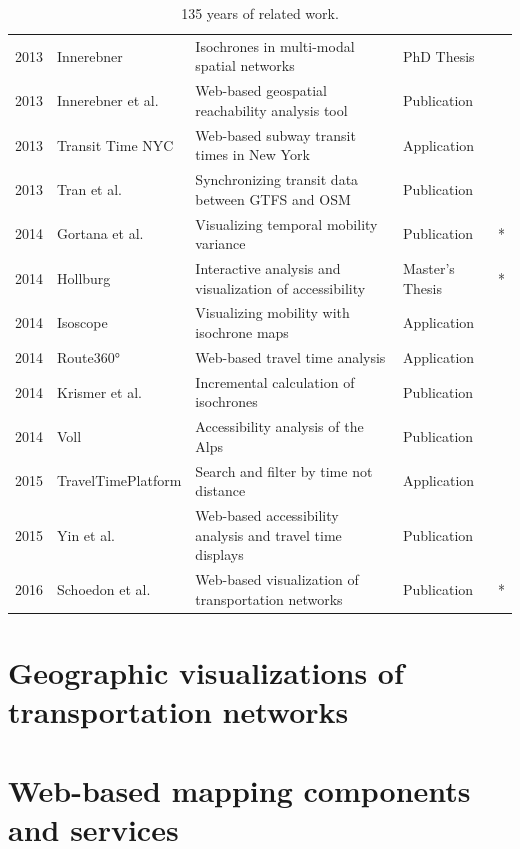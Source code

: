 \begin{table}[htb]
\begin{tabular}{r|l|l|l|c}
        2013 & Innerebner \cite{Innerebner2013} & Isochrones in multi-modal spatial networks  & PhD Thesis  & \\
        2013 & Innerebner et al. \cite{innerebner2013isoga} & Web-based geospatial reachability analysis tool  & Publication  & \\
        2013 & Transit Time NYC \cite{TransitTimeNYC} & Web-based subway transit times in New York & Application & \\
        2013 & Tran et al. \cite{tran2013go_sync} & Synchronizing transit data between GTFS and OSM  & Publication  & \\
        2014 & Gortana et al. \cite{gortanaisoscope} & Visualizing temporal mobility variance  & Publication  & * \\
        2014 & Hollburg \cite{Hollburg2014} & Interactive analysis and visualization of accessibility & Master's Thesis  & * \\
        2014 & Isoscope \cite{Isoscope} & Visualizing mobility with isochrone maps  & Application  & \\
        2014 & Route360° \cite{Route360} & Web-based travel time analysis  & Application  & \\
        2014 & Krismer et al. \cite{krismer2014incremental} & Incremental calculation of isochrones  & Publication  & \\
        2014 & Voll \cite{vollerreichbarkeiten} & Accessibility analysis of the Alps  & Publication  & \\
        2015 & TravelTimePlatform \cite{TravelTimePlatform} & Search and filter by time not distance  & Application  & \\
        2015 & Yin et al. \cite{yin2015understanding} & Web-based accessibility analysis and travel time displays  & Publication  & \\
        2016 & Schoedon et al. \cite{STHD2016} & Web-based visualization of transportation networks  & Publication  & * \\
      \end{tabular}
      \caption{135 years of related work.}
      \label{tab:overv:relat}
    \end{table}

  \section{Geographic visualizations of transportation networks}
    \label{sec:overv:geovs}

  \section{Web-based mapping components and services}
    \label{sec:overv:webmp}

